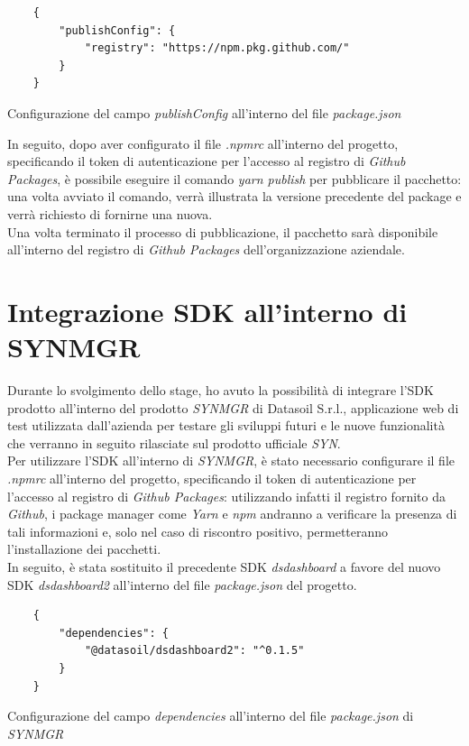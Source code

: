 \begin{listing}[H]
    \begin{verbatim}
    {
        "publishConfig": {
            "registry": "https://npm.pkg.github.com/"
        }
    }
    \end{verbatim}
    \caption{Configurazione del campo \textit{publishConfig} all'interno del file \textit{package.json}}
    \label{listing:package_json_publish_config}
\end{listing}

In seguito, dopo aver configurato il file \textit{.npmrc} all'interno del progetto, specificando il token di autenticazione per l'accesso al registro di \textit{Github Packages},
è possibile eseguire il comando \textit{yarn publish} per pubblicare il pacchetto: una volta avviato il comando, verrà illustrata la versione precedente del
package e verrà richiesto di fornirne una nuova. \\
Una volta terminato il processo di pubblicazione, il pacchetto sarà disponibile all'interno del registro di \textit{Github Packages} dell'organizzazione aziendale.

\section{Integrazione SDK all'interno di SYNMGR}
Durante lo svolgimento dello stage, ho avuto la possibilità di integrare l'SDK prodotto all'interno del prodotto \textit{SYNMGR} di Datasoil S.r.l.,
applicazione web di test utilizzata dall'azienda per testare gli sviluppi futuri e le nuove funzionalità che verranno in seguito rilasciate sul prodotto ufficiale \textit{SYN}. \\
Per utilizzare l'SDK all'interno di \textit{SYNMGR}, è stato necessario configurare il file \textit{.npmrc} all'interno del progetto, specificando il token di autenticazione
per l'accesso al registro di \textit{Github Packages}: utilizzando infatti il registro fornito da \textit{Github}, i package manager come \textit{Yarn} e \textit{npm} andranno
a verificare la presenza di tali informazioni e, solo nel caso di riscontro positivo, permetteranno l'installazione dei pacchetti. \\
In seguito, è stata sostituito il precedente SDK \textit{dsdashboard} a favore del nuovo SDK \textit{dsdashboard2} all'interno del file \textit{package.json} del progetto.

\begin{listing}[H]
    \begin{verbatim}
    {
        "dependencies": {
            "@datasoil/dsdashboard2": "^0.1.5"
        }
    }
    \end{verbatim}
    \caption{Configurazione del campo \textit{dependencies} all'interno del file \textit{package.json} di \textit{SYNMGR}}
    \label{listing:package_json_synmgr}
\end{listing}

